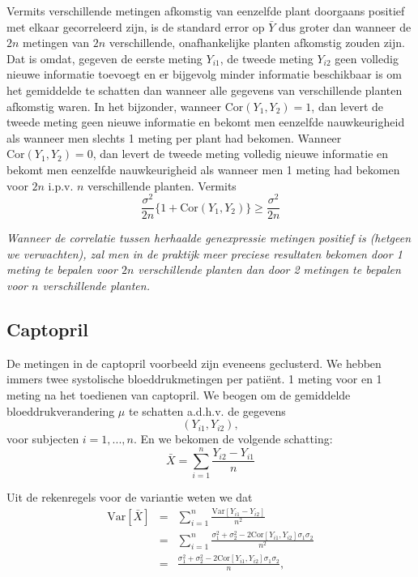 \documentclass[
  12pt,dutch,coursenotes]{book}
\theoremstyle{definition}
\theoremstyle{definition}
\theoremstyle{definition}
\theoremstyle{remark}
\begin{document}
Vermits verschillende metingen afkomstig van eenzelfde plant doorgaans
positief met elkaar gecorreleerd zijn, is de standard error op \(\bar Y\) dus
groter dan wanneer de \(2n\) metingen van \(2n\) verschillende, onafhankelijke
planten afkomstig zouden zijn. Dat is omdat, gegeven de eerste meting \(Y_{i1}\), de tweede meting \(Y_{i2}\) geen volledig nieuwe informatie toevoegt en er bijgevolg minder informatie beschikbaar is om het gemiddelde te
schatten dan wanneer alle gegevens van verschillende planten afkomstig
waren. In het bijzonder, wanneer \(\text{Cor}(Y_{1},Y_{2})=1\), dan levert de tweede meting geen nieuwe informatie en bekomt men eenzelfde nauwkeurigheid als wanneer men slechts 1 meting per plant had bekomen. Wanneer \(\text{Cor}(Y_{1},Y_{2})=0\), dan levert de tweede meting volledig nieuwe informatie en bekomt men eenzelfde nauwkeurigheid als wanneer men 1 meting had bekomen voor \(2n\) i.p.v. \(n\) verschillende planten. Vermits
\[\frac{\sigma^2}{2n}\{1+\text{Cor}(Y_{1},Y_{2})\}\geq \frac{\sigma^2}{2n}\]

\emph{Wanneer de correlatie tussen herhaalde genexpressie metingen positief is (hetgeen we verwachten), zal men in de praktijk meer preciese resultaten bekomen door 1 meting te bepalen voor \(2n\) verschillende planten dan door 2 metingen te bepalen voor \(n\) verschillende planten.}

\hypertarget{captopril}{%
\subsection{Captopril}\label{captopril}}

De metingen in de captopril voorbeeld zijn eveneens geclusterd. We hebben immers twee systolische bloeddrukmetingen per patiënt.
1 meting voor en 1 meting na het toedienen van captopril.
We beogen om de gemiddelde bloeddrukverandering \(\mu\) te schatten a.d.h.v. de gegevens
\[(Y_{i1} , Y_{i2}),\]
voor subjecten \(i = 1, ..., n\).
En we bekomen de volgende schatting:
\[\bar X = \sum_{i=1}^n \frac{Y_{i2}-Y_{i1}}{n}\]

Uit de rekenregels voor de variantie weten we dat
\begin{eqnarray*}
\text{Var}\left[\bar X\right]&=&\sum_{i=1}^n \frac{\text{Var}\left[Y_{i1}-Y_{i2}\right]}{n^2}\\
&=&\sum_{i=1}^n \frac{\sigma^2_1+\sigma^2_2-2\text{Cor}\left[Y_{i1},Y_{i2}\right]\sigma_1\sigma_2}{n^2}\\
&=&\frac{\sigma^2_1+\sigma^2_2-2\text{Cor}\left[Y_{i1},Y_{i2}\right]\sigma_1\sigma_2}{n},\\
\end{eqnarray*}
\end{document}
